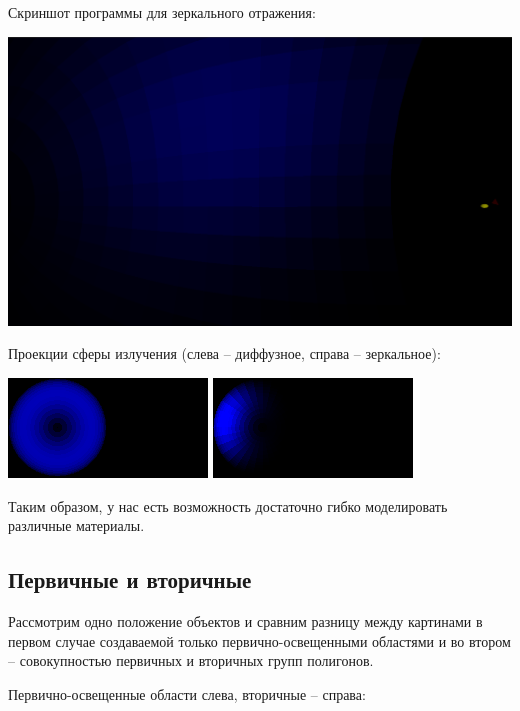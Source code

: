 Скриншот программы для зеркального отражения:

\includegraphics[width=1\linewidth]{zerkalo-screen.png}

Проекции сферы излучения (слева -- диффузное, справа -- зеркальное):

\includegraphics[width=0.499\linewidth]{lambert-map.png}
\includegraphics[width=0.499\linewidth]{zerkalo-map.png}

Таким образом, у нас есть возможность достаточно гибко моделировать различные материалы. 

\subsection*{Первичные и вторичные}

Рассмотрим одно положение объектов и сравним разницу между картинами в первом случае создаваемой только первично-освещенными областями и во втором -- совокупностью первичных и вторичных групп полигонов. 

Первично-освещенные области слева, вторичные -- справа:

